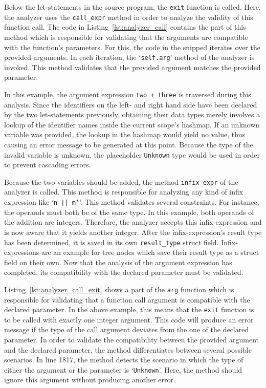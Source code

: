 Below the let-statements in the source program, the \texttt{exit} function is called.
Here, the analyzer uses the \texttt{call\_expr} method in order to analyze the validity of this function call.
The code in Listing~\ref{lst:analyzer_call} contains the part of this method which is responsible for validating that the arguments are compatible with the function's parameters.
For this, the code in the snipped iterates over the provided arguments.
In each iteration, the `\texttt{self.arg}' method of the analyzer is invoked.
This method validates that the provided argument matches the provided parameter.

In this example, the argument expression \texttt{two + three} is traversed during this analysis.
Since the identifiers on the left- and right hand side have been declared by the two let-statements previously,
obtaining their data types merely involves a lookup of the identifier names inside the current scope's hashmap.
If an unknown variable was provided, the lookup in the hashmap would yield no value, thus causing an error message to be generated at this point.
Because the type of the invalid variable is unknown, the placeholder \texttt{Unknown} type would be used in order to prevent cascading errors.

Because the two variables should be added, the method \texttt{infix\_expr} of the analyzer is called.
This method is responsible for analyzing any kind of infix expression like `\texttt{n || m'}'.
This method validates several constraints.
For instance, the operands must both be of the same type.
In this example, both operands of the addition are integers.
Therefore, the analyzer accepts this infix-expression and is now aware that it yields another integer.
After the infix-expression's result type has been determined, it is saved in its own \texttt{result\_type} struct field.
Infix-expressions are an example for tree nodes which save their result type as a struct field on their own.
Now that the analysis of the argument expression has completed, its compatibility with the declared parameter must be validated.


Listing~\ref{lst:analyzer_call_exit} shows a part of the \texttt{arg} function which is responsible for validating that a function call argument is compatible with the declared parameter.
In the above example, this means that the \texttt{exit} function is to be called with exactly one integer argument.
This code will produce an error message if the type of the call argument deviates from the one of the declared parameter.
In order to validate the compatibility between the provided argument and the declared parameter, the method differentiates between several possible scenarios.
In line 1817, the method detects the scenario in which the type of either the argument or the parameter is `\texttt{Unknown}'.
Here, the method should ignore this argument without producing another error.

